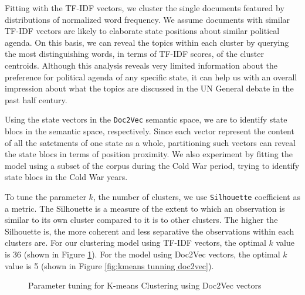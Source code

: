 \documentclass[final,authoryear,3p,12pt,times,hidelinks]{elsarticle}
\begin{document}
Fitting with the TF-IDF vectors, we cluster the single documents featured by distributions of normalized word frequency. We assume documents with similar TF-IDF vectors are likely to elaborate state positions about similar political agenda. On this basis, we can reveal the topics within each cluster by querying the most distinguishing words, in terms of TF-IDF scores, of the cluster centroids. Although this analysis reveals very limited information about the preference for political agenda of any specific state, it can help us with an overall impression about what the topics are discussed in the UN General debate in the past half century. 

Using the state vectors in the \texttt{Doc2Vec} semantic space, we are to identify state blocs in the semantic space, respectively. Since each vector represent the content of all the satetments of one state as a whole, partitioning such vectors can reveal the state blocs in terms of position proximity. We also experiment by fitting the model using a subset of the corpus during the Cold War period, trying to identify state blocs in the Cold War years. 

To tune the parameter $k$, the number of clusters, we use \texttt{Silhouette} coefficient as a metric. The Silhouette is a measure of the extent to which an observation is similar to its own cluster compared to it is to other clusters. The higher the Silhouette is, the more coherent and less separative the observations within each clusters are. For our clustering model using TF-IDF vectors, the optimal $k$ value is 36 (shown in Figure \ref{fig:kmeans tunning tfidf}). For the model using Doc2Vec vectors, the optimal $k$ value is 5 (shown in Figure \ref{fig:kmeans tunning doc2vec}). 

\begin{figure}[ht!]
  \centering
  \qquad
  \caption{Parameter tuning for K-means Clustering using Doc2Vec vectors}
  \label{fig:kmeans tunning tfidf}
\end{figure}
\end{document}
